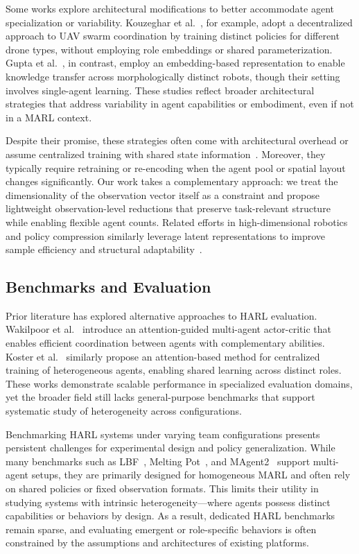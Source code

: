 \documentclass{article}
\begin{document}
Some works explore architectural modifications to better accommodate agent specialization 
or variability. Kouzeghar et al.~\cite{kouzeghar2023}, for example, adopt a decentralized 
approach to UAV swarm coordination by training distinct policies for different drone types, 
without employing role embeddings or shared parameterization. 
Gupta et al.~\cite{gupta2017a}, in contrast, employ an embedding-based representation to 
enable knowledge transfer across morphologically distinct robots, though their setting 
involves single-agent learning. These studies reflect broader architectural strategies that 
address variability in agent capabilities or embodiment, even if not in a MARL context.

Despite their promise, these strategies often come with architectural overhead or assume 
centralized training with shared state information~\cite{foerster2017}. Moreover, they typically 
require retraining or re-encoding when the agent pool or spatial layout changes significantly. 
Our work takes a complementary approach: we treat the dimensionality of the observation vector 
itself as a constraint and propose lightweight observation-level reductions that preserve 
task-relevant structure while enabling flexible agent counts. Related efforts in 
high-dimensional robotics and policy compression similarly leverage latent representations 
to improve sample efficiency and structural adaptability~\cite{bitzer2010, tangkaratt2016}.

\subsection{Benchmarks and Evaluation}

Prior literature has explored alternative approaches to HARL evaluation. 
Wakilpoor et al.~\cite{wakilpoor2020} introduce an attention-guided multi-agent actor-critic 
that enables efficient coordination between agents with complementary abilities. 
Koster et al.~\cite{koster2020} similarly propose an attention-based method for centralized 
training of heterogeneous agents, enabling shared learning across distinct roles. 
These works demonstrate scalable performance in specialized evaluation domains, 
yet the broader field still lacks general-purpose benchmarks that support systematic 
study of heterogeneity across configurations.

Benchmarking HARL systems under varying team configurations presents persistent
challenges for experimental design and policy generalization. While many benchmarks 
such as LBF~\cite{papoudakis2021}, Melting Pot~\cite{leibo2021}, and MAgent2~\cite{zheng2017} 
support multi-agent setups, they are primarily designed for homogeneous MARL 
and often rely on shared policies or fixed observation formats. This limits 
their utility in studying systems with intrinsic heterogeneity—where agents possess 
distinct capabilities or behaviors by design. As a result, dedicated HARL benchmarks 
remain sparse, and evaluating emergent or role-specific behaviors is often constrained 
by the assumptions and architectures of existing platforms.
\end{document}
